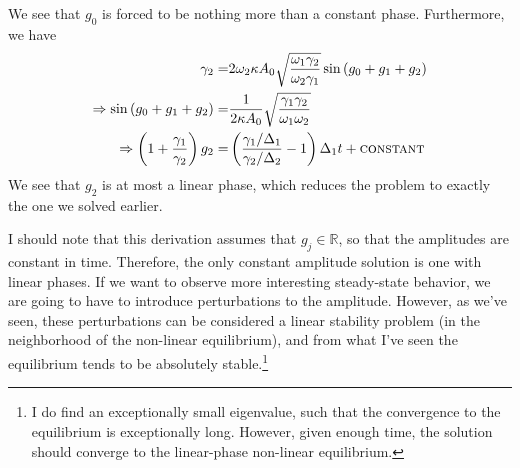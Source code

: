 We see that $g_0$ is forced to be nothing more than a constant phase. Furthermore, we have
\begin{subequations}
\begin{align}
\gamma_2 = & 2\omega_2 \kappa A_0 \sqrt{\frac{\omega_1\gamma_2}{\omega_2\gamma_1}} \sin \left(g_0 + g_1 + g_2\right) \\
\Rightarrow \sin\left(g_0 + g_1 + g_2\right) = & \frac{1}{2\kappa A_0}\sqrt{\frac{\gamma_1\gamma_2}{\omega_1\omega_2}} \\
\Rightarrow \left(1 + \frac{\gamma_1}{\gamma_2}\right) g_2 = & \left(\frac{\gamma_1/\Delta_1}{\gamma_2/\Delta_2} - 1\right) \Delta_1 t + \textsc{constant}
\end{align}
\end{subequations}
We see that $g_2$ is at most a linear phase, which reduces the problem to exactly the one we solved earlier.

I should note that this derivation assumes that $g_j\in\mathbb{R}$, so that the amplitudes are constant in time. Therefore, the only constant amplitude solution is one with linear phases. If we want to observe more interesting steady-state behavior, we are going to have to introduce perturbations to the amplitude. However, as we've seen, these perturbations can be considered a linear stability problem (in the neighborhood of the non-linear equilibrium), and from what I've seen the equilibrium tends to be absolutely stable.\footnote{I do find an exceptionally small eigenvalue, such that the convergence to the equilibrium is exceptionally long. However, given enough time, the solution should converge to the linear-phase non-linear equilibrium.}

